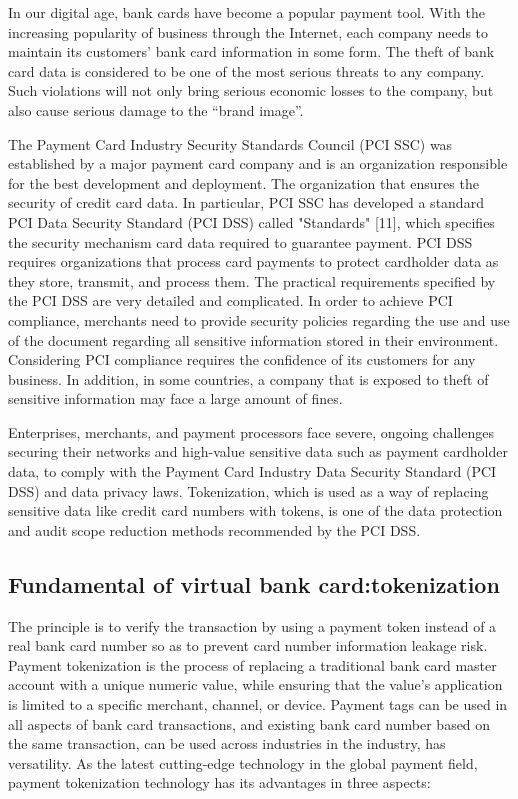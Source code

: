 \documentclass[journal]{IEEEtran}
\begin{document}
In our digital age, bank cards have become a popular payment tool. With the increasing popularity of business through the Internet, each company needs to maintain its customers' bank card information in some form. The theft of bank card data is considered to be one of the most serious threats to any company. Such violations will not only bring serious economic losses to the company, but also cause serious damage to the “brand image”.

The Payment Card Industry Security Standards Council (PCI SSC) was established by a major payment card company and is an organization responsible for the best development and deployment. The organization that ensures the security of credit card data. In particular, PCI SSC has developed a standard PCI Data Security Standard (PCI DSS) called "Standards" [11], which specifies the security mechanism card data required to guarantee payment. PCI DSS requires organizations that process card payments to protect cardholder data as they store, transmit, and process them. The practical requirements specified by the PCI DSS are very detailed and complicated. In order to achieve PCI compliance, merchants need to provide security policies regarding the use and use of the document regarding all sensitive information stored in their environment. Considering PCI compliance requires the confidence of its customers for any business. In addition, in some countries, a company that is exposed to theft of sensitive information may face a large amount of fines.

Enterprises, merchants, and payment processors face severe, ongoing challenges securing their networks and high-value sensitive data such as payment cardholder data, to comply with the Payment Card Industry Data Security Standard (PCI DSS) and data privacy laws. Tokenization, which is used as a way of replacing sensitive data like credit card numbers with tokens, is one of the data protection and audit scope reduction methods recommended by the PCI DSS. 



\subsection{Fundamental of virtual bank card:tokenization }


The principle is to verify the transaction by using a payment token instead of a real bank card number so as to prevent card number information leakage risk. Payment tokenization is the process of replacing a traditional bank card master account with a unique numeric value, while ensuring that the value's application is limited to a specific merchant, channel, or device. Payment tags can be used in all aspects of bank card transactions, and existing bank card number based on the same transaction, can be used across industries in the industry, has versatility.
As the latest cutting-edge technology in the global payment field, payment tokenization technology has its advantages in three aspects:
\end{document}

